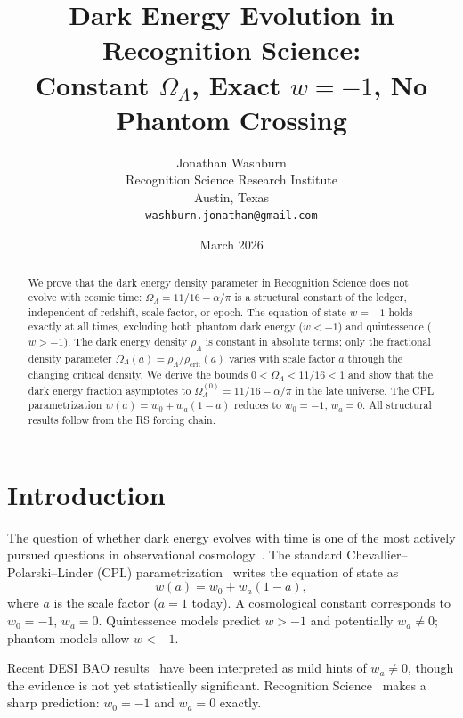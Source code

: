 \documentclass[12pt,a4paper]{article}
\title{Dark Energy Evolution in Recognition Science:\\
Constant $\Omega_\Lambda$, Exact $w = -1$, No Phantom Crossing}
\author{Jonathan Washburn\\
Recognition Science Research Institute\\
Austin, Texas\\
\texttt{washburn.jonathan@gmail.com}}
\date{March 2026}
\theoremstyle{definition}
\theoremstyle{remark}
\begin{document}
\maketitle

\begin{abstract}
We prove that the dark energy density parameter in Recognition
Science does not evolve with cosmic time:
$\Omega_\Lambda = 11/16 - \alpha/\pi$ is a structural constant of
the ledger, independent of redshift, scale factor, or epoch.  The
equation of state $w = -1$ holds exactly at all times, excluding
both phantom dark energy ($w < -1$) and quintessence ($w > -1$).
The dark energy density $\rho_\Lambda$ is constant in absolute
terms; only the fractional density parameter
$\Omega_\Lambda(a) = \rho_\Lambda/\rho_{\mathrm{crit}}(a)$ varies
with scale factor $a$ through the changing critical density.  We
derive the bounds $0 < \Omega_\Lambda < 11/16 < 1$ and show that
the dark energy fraction asymptotes to $\Omega_\Lambda^{(0)} =
11/16 - \alpha/\pi$ in the late universe.  The CPL
parametrization $w(a) = w_0 + w_a(1-a)$ reduces to $w_0 = -1$,
$w_a = 0$.  All structural results follow from the RS forcing chain.
\end{abstract}

\section{Introduction}
\label{sec:intro}

The question of whether dark energy evolves with time is one of the
most actively pursued questions in observational
cosmology~\cite{Planck2020, DESI2024}.  The standard
Chevallier--Polarski--Linder (CPL) parametrization~\cite{CPL}
writes the equation of state as
\begin{equation}
  w(a) = w_0 + w_a(1-a),
  \label{eq:CPL}
\end{equation}
where $a$ is the scale factor ($a = 1$ today).  A cosmological
constant corresponds to $w_0 = -1$, $w_a = 0$.  Quintessence
models predict $w > -1$ and potentially $w_a \neq 0$; phantom
models allow $w < -1$.

Recent DESI BAO results~\cite{DESI2024} have been interpreted as
mild hints of $w_a \neq 0$, though the evidence is not yet
statistically significant.  Recognition Science~\cite{RS_Axioms} makes a sharp
prediction: $w_0 = -1$ and $w_a = 0$ exactly.
\end{document}
